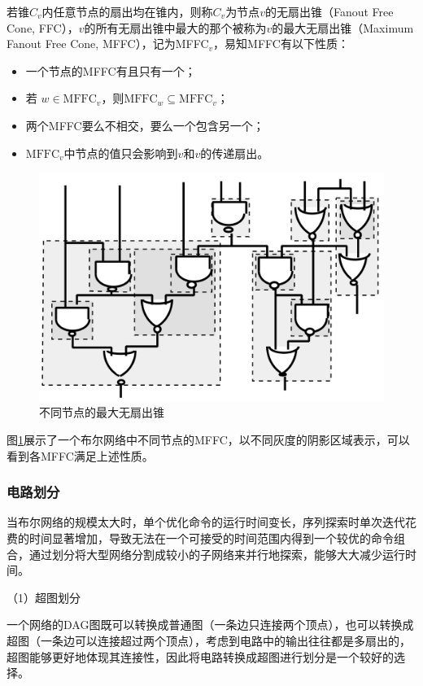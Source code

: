 若锥$C_v$内任意节点的扇出均在锥内，则称$C_v$为节点$v$的无扇出锥（Fanout Free Cone, FFC），$v$的所有无扇出锥中最大的那个被称为$v$的最大无扇出锥（Maximum Fanout Free Cone, MFFC），记为MFFC$_v$，易知MFFC有以下性质\cite{LS:exact_rewriting,FPGA:Jason_Cong_1993,FPGA:Jason_Cong_patition}：
\begin{itemize}
    \item 一个节点的MFFC有且只有一个；
    \item 若 $w \in \text{MFFC}_v$，则$\text{MFFC}_w \subseteq \text{MFFC}_v$；
    \item 两个MFFC要么不相交，要么一个包含另一个；
    \item $\text{MFFC}_v$中节点的值只会影响到$v$和$v$的传递扇出。
\end{itemize}
\begin{figure}[!htbp]
    \centering
    \includegraphics[width=0.6\linewidth]{./figs/LS-MFFC.png}
    \caption{不同节点的最大无扇出锥}
    \label{LS:MFFC}
\end{figure}
图\ref{LS:MFFC}展示了一个布尔网络中不同节点的MFFC，以不同灰度的阴影区域表示，可以看到各MFFC满足上述性质。


\subsubsection{电路划分}

当布尔网络的规模太大时，单个优化命令的运行时间变长，序列探索时单次迭代花费的时间显著增加，导致无法在一个可接受的时间范围内得到一个较优的命令组合，通过划分将大型网络分割成较小的子网络来并行地探索，能够大大减少运行时间。

（1）超图划分

一个网络的DAG图既可以转换成普通图（一条边只连接两个顶点），也可以转换成超图（一条边可以连接超过两个顶点），考虑到电路中的输出往往都是多扇出的，超图能够更好地体现其连接性，因此将电路转换成超图进行划分是一个较好的选择\cite{LS:LSOracle}。

